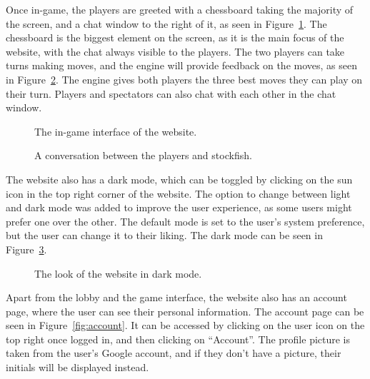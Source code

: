 Once in-game, the players are greeted with a chessboard taking the majority of the screen, and a chat window to the
right of it, as seen in Figure~\ref{fig:game}.
The chessboard is the biggest element on the screen, as it is the main focus of the website, with the chat always
visible to the players.
The two players can take turns making moves, and the engine will provide feedback on the moves, as seen in
Figure~\ref{fig:game-chat}.
The engine gives both players the three best moves they can play on their turn.
Players and spectators can also chat with each other in the chat window.

\begin{figure}[H]
    \centering
    \setlength{\fboxsep}{0pt}
    \caption{The in-game interface of the website.}\label{fig:game}
\end{figure}

\begin{figure}[H]
    \centering
    \setlength{\fboxsep}{0pt}
    \caption{A conversation between the players and stockfish.}\label{fig:game-chat}
\end{figure}

The website also has a dark mode, which can be toggled by clicking on the sun icon in the top right corner of the
website.
The option to change between light and dark mode was added to improve the user experience, as some users might prefer
one over the other.
The default mode is set to the user's system preference, but the user can change it to their liking.
The dark mode can be seen in Figure~\ref{fig:game-dark}.

\begin{figure}[H]
    \centering
    \setlength{\fboxsep}{0pt}
    \caption{The look of the website in dark mode.}\label{fig:game-dark}
\end{figure}

Apart from the lobby and the game interface, the website also has an account page, where the user can see their
personal information.
The account page can be seen in Figure~\ref{fig:account}.
It can be accessed by clicking on the user icon on the top right once logged in, and then clicking on ``Account''.
The profile picture is taken from the user's Google account, and if they don't have a picture, their initials will be
displayed instead.

